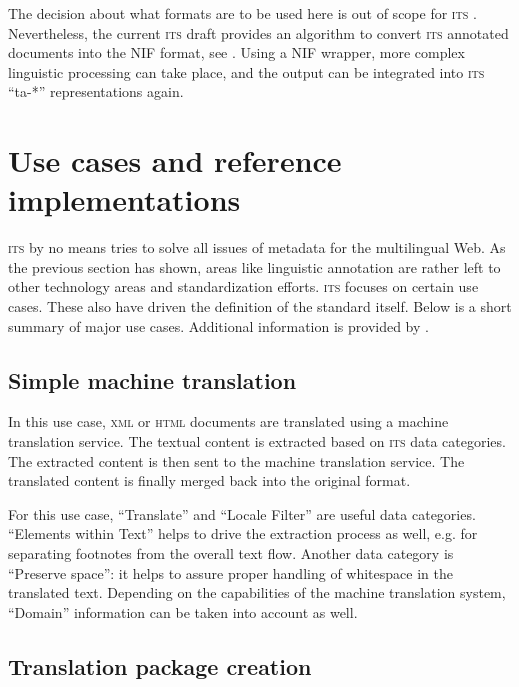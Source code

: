 \documentclass[output=paper]{LSP/langsci}
\begin{document}
The decision about what formats are to be used here is out of scope for \textsc{its }. Nevertheless, the current \textsc{its } draft provides an algorithm to convert \textsc{its } annotated documents into the NIF format, see \citet{RizzoEtAl2012}. Using a NIF wrapper, more complex linguistic processing can take place, and the output can be integrated into \textsc{its } ``ta-*'' representations again.

\section{Use cases and reference implementations}\label{sec:sasaki:5}

\textsc{its } by no means tries to solve all issues of metadata for the multilingual Web. As the previous section has shown, areas like linguistic annotation are rather left to other technology areas and standardization efforts. \textsc{its } focuses on certain use cases. These also have driven the definition of the standard itself. Below is a short summary of major use cases. Additional information is provided by \citet{Lieske2013}.

\subsection{Simple machine translation}\label{sec:sasaki:5.1}

In this use case, \textsc{xml} or \textsc{html} documents are translated using a machine translation service. The textual content is extracted based on \textsc{its } data categories. The extracted content is then sent to the machine translation service. The translated content is finally merged back into the original format.

For this use case, ``Translate'' and ``Locale Filter'' are useful data categories. ``Elements within Text'' helps to drive the extraction process as well, e.g. for separating footnotes from the overall text flow. Another data category is ``Preserve space'': it helps to assure proper handling of whitespace in the translated text. Depending on the capabilities of the machine translation system, ``Domain'' information can be taken into account as well. 

\subsection{Translation package creation}\label{sec:sasaki:5.2}
\end{document}
